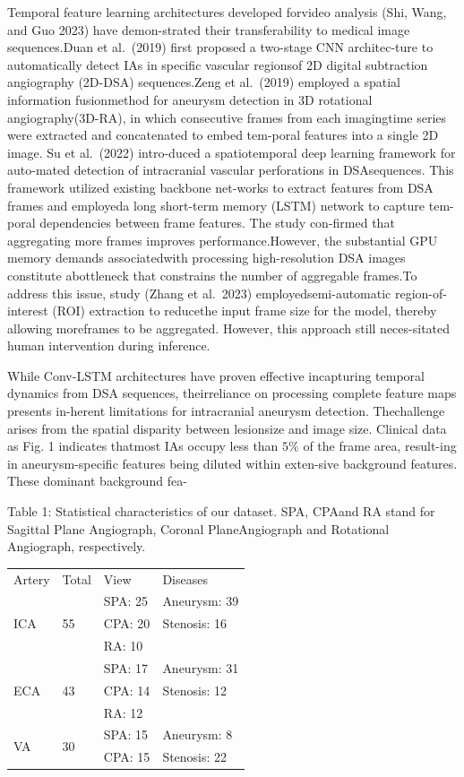 \documentclass[
  10
]{article}
\newcounter{none} %
\begin{document}
Temporal feature learning architectures developed forvideo analysis
(Shi, Wang, and Guo 2023) have demon-strated their transferability to
medical image sequences.Duan et al.~(2019) first proposed a two-stage
CNN architec-ture to automatically detect IAs in specific vascular
regionsof 2D digital subtraction angiography (2D-DSA) sequences.Zeng et
al.~(2019) employed a spatial information fusionmethod for aneurysm
detection in 3D rotational angiography(3D-RA), in which consecutive
frames from each imagingtime series were extracted and concatenated to
embed tem-poral features into a single 2D image. Su et al.~(2022)
intro-duced a spatiotemporal deep learning framework for auto-mated
detection of intracranial vascular perforations in DSAsequences. This
framework utilized existing backbone net-works to extract features from
DSA frames and employeda long short-term memory (LSTM) network to
capture tem-poral dependencies between frame features. The study
con-firmed that aggregating more frames improves performance.However,
the substantial GPU memory demands associatedwith processing
high-resolution DSA images constitute abottleneck that constrains the
number of aggregable frames.To address this issue, study (Zhang et
al.~2023) employedsemi-automatic region-of-interest (ROI) extraction to
reducethe input frame size for the model, thereby allowing moreframes to
be aggregated. However, this approach still neces-sitated human
intervention during inference.

While Conv-LSTM architectures have proven effective incapturing temporal
dynamics from DSA sequences, theirreliance on processing complete
feature maps presents in-herent limitations for intracranial aneurysm
detection. Thechallenge arises from the spatial disparity between
lesionsize and image size. Clinical data as Fig. 1 indicates thatmost
IAs occupy less than \(5 \%\) of the frame area, result-ing in
aneurysm-specific features being diluted within exten-sive background
features. These dominant background fea-

Table 1: Statistical characteristics of our dataset. SPA, CPAand RA
stand for Sagittal Plane Angiograph, Coronal PlaneAngiograph and
Rotational Angiograph, respectively.

{\def\LTcaptype{none} %
\begin{longtable}[]{@{}llll@{}}
\toprule\noalign{}
\endhead
\bottomrule\noalign{}
\endlastfoot
Artery & Total & View & Diseases \\
\multirow{3}{*}{ICA} & \multirow{3}{*}{55} & SPA: 25 & Aneurysm: 39 \\
& & CPA: 20 & Stenosis: 16 \\
& & RA: 10 & \\
\multirow{3}{*}{ECA} & \multirow{3}{*}{43} & SPA: 17 & Aneurysm: 31 \\
& & CPA: 14 & Stenosis: 12 \\
& & RA: 12 & \\
\multirow{2}{*}{VA} & \multirow{2}{*}{30} & SPA: 15 & Aneurysm: 8 \\
& & CPA: 15 & Stenosis: 22 \\
\end{longtable}
}
\end{document}
